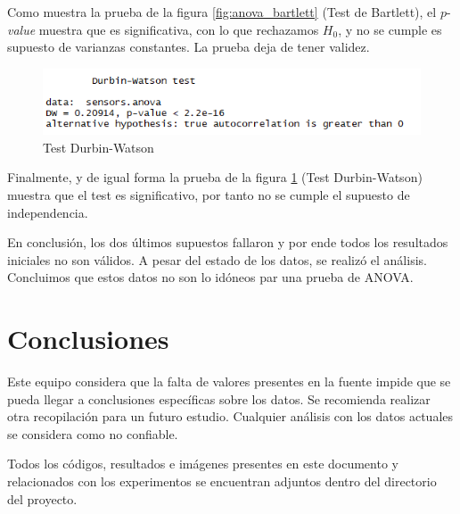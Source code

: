 \documentclass[a4paper,10pt,twocolumn]{article}
\begin{document}
 Como muestra la prueba de la figura \ref{fig:anova_bartlett} (Test de Bartlett), el $p$-\textit{value} muestra que es significativa, con lo que rechazamos $H_0$, y no se cumple es supuesto de varianzas constantes. La prueba deja de tener validez.
 
 \begin{figure}[h!]
 	\centering
 	\includegraphics[width=\linewidth]{Images/anova_durbin.png}
 	\caption{Test Durbin-Watson}
 	\label{fig:anova_dwtest}
 \end{figure}
 
 Finalmente, y de igual forma la prueba de la figura \ref{fig:anova_dwtest} (Test Durbin-Watson) muestra que el test es significativo, por tanto no se cumple el supuesto de independencia.
 
 En conclusi\'on, los dos \'ultimos supuestos fallaron y por ende todos los resultados iniciales no son v\'alidos. A pesar del estado de los datos, se realiz\'o el an\'alisis. Concluimos que estos datos no son lo id\'oneos par una prueba de ANOVA.  
 
 \section{Conclusiones}
 
 Este equipo considera que la falta de valores presentes en la fuente impide que se pueda llegar a conclusiones específicas sobre los datos. Se recomienda realizar otra recopilación para un futuro estudio. Cualquier análisis con los datos actuales se considera como no confiable.
 
 Todos los códigos, resultados e imágenes presentes en este documento y relacionados con los experimentos se encuentran adjuntos dentro del directorio del proyecto.
 
\label{end}
\end{document}
